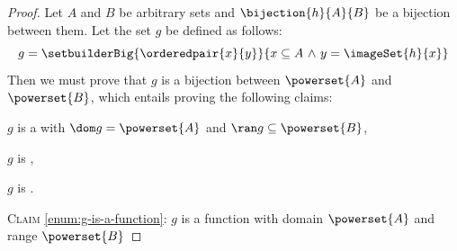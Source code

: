 \begin{proof}
    Let \( A \) and \( B \) be arbitrary sets and \( \bijection{h}{A}{B} \) be a bijection between them.
    Let the set \( g \) be defined as follows:
    \begin{equation}
        \label{eq:define-the-mapping-g-between-powersets}
        g = \setbuilderBig{\orderedpair{x}{y}}{x \subseteq A \,\,{\land}\,\, y = \imageSet{h}{x} }
    \end{equation}
    Then we must prove that \( g \) is a bijection between \( \powerset{A} \) and \( \powerset{B} \), which entails
    proving the following claims:
    \begin{enumerate*}[label=(\roman*)]
        \item \( g \) is a  with \( \dom g = \powerset{A} \) and \( \ran g \subseteq \powerset{B} \),  \label{enum:g-is-a-function}
        \item \( g \) is ,  \label{enum:g-is-injective}
        \item \( g \) is .  \label{enum:g-is-surjective}
    \end{enumerate*}

    \vspace{0.5cm}
    \noindent
    {\scshape Claim} \ref{enum:g-is-a-function}: \( g \) is a function with domain \( \powerset{A} \) and range \( \powerset{B} \)


\end{proof}
